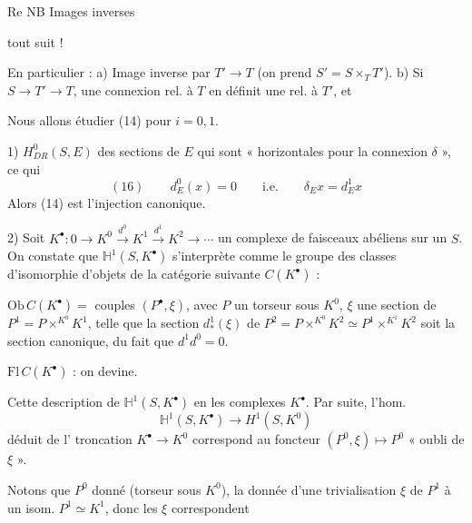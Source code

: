 \documentclass[11pt,a4paper]{article}
\begin{document}
Re NB  Images inverses 
\add{\ill{})} tout suit \ill{} !

En particulier : \struck{\ill{}} a) Image inverse par $T' \to T$ (on prend $S' = S \times_T T'$).
b) Si $S \to T' \to T$, une connexion rel. à $T$ en définit une rel. à $T'$, et


Nous allons étudier (14) pour $i = 0, 1$.

1) $H^0_{DR}(S,E)$  des sections de $E$ qui sont
\struck{\ill{}} « horizontales pour la connexion $\delta$ », ce qui 
\[
(16)\qquad d^0_E(x) = 0 \qquad\text{i.e.}\qquad \delta_E x = d^1_E x
\]
Alors (14) est l'injection canonique. \struck{\ill{}}

2) Soit $K^\bullet : 0 \to K^0 \xrightarrow{d^0} K^1 \xrightarrow{d^1} K^2 \to \cdots$ un complexe
\struck{\ill{}} de faisceaux abéliens sur un  $S$.
 On constate que $\mathbb{H}^1(S,K^\bullet)$
s'interprète comme le groupe des classes d'isomorphie d'objets de la catégorie suivante
$C(K^\bullet)$ :

$\mathrm{Ob}\,C(K^\bullet) =$ couples $(P^\bullet, \xi)$, avec $P$ un torseur sous $K^0$,
$\xi$ une section de $P^1 = P \times^{K^0} K^1$, telle que la section
\struck{\ill{}} $d^1_*(\xi)$ de $P^2 = P \times^{K^0} K^2 \simeq P^1 \times^{K^1} K^2$
soit la section canonique,  du fait que $d^1 d^0 = 0$.

$\mathrm{Fl}\,C(K^\bullet)$ : on devine.

 Cette description de $\mathbb{H}^1(S,K^\bullet)$ \ill{}
en  les complexes $K^\bullet$. Par suite,
l'hom.  
\[
\mathbb{H}^1(S,K^\bullet) \longrightarrow H^1(S,K^0)
\]
déduit de l'\struck{\ill{}} troncation $K^\bullet \to K^0$ correspond au foncteur
$(P^0,\xi) \longmapsto P^0$ « oubli de $\xi$ ».

Notons que \struck{\ill{}} \add{\ill{}} $P^0$ donné (torseur sous $K^0$), la donnée d'une
trivialisation $\xi$ de $P^1$  à un isom. \struck{\ill{}} \add{\ill{}}
$P^1 \simeq K^1$, donc les $\xi$ correspondent
\end{document}
